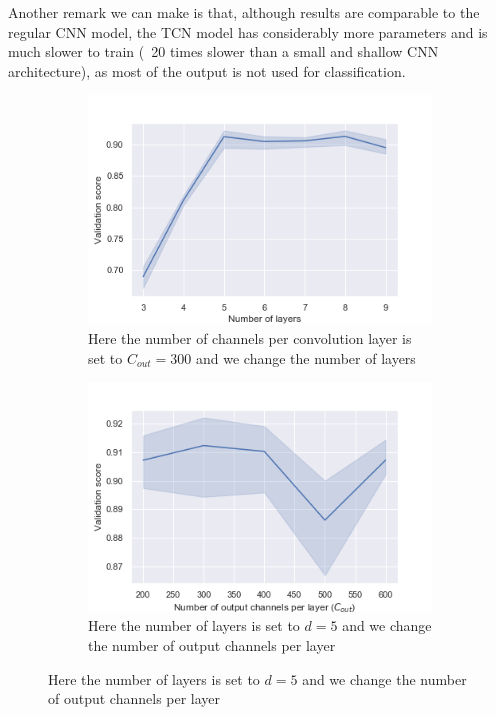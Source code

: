 \documentclass{article}
\begin{document}
Another remark we can make is that, although results are comparable to the regular CNN model, the TCN model has considerably more parameters and is much slower to train (~20 times slower than a small and shallow CNN architecture), as most of the output is not used for classification.
\begin{figure}
    \centering
    \begin{subfigure}{0.45\linewidth}
        \includegraphics[width=\linewidth]{img/tcn_nb_layers.png}
        \caption{Here the number of channels per convolution layer is set to $C_{out}=300$ and we change the number of layers}
        \label{fig:tcn_nb_layers}            
    \end{subfigure}
    \begin{subfigure}{0.45\linewidth}
        \includegraphics[width=\linewidth]{img/tcn_nb_channels.png}
        \caption{Here the number of layers is set to $d=5$ and we change the number of output channels per layer}

\end{subfigure}
\end{figure}
\end{document}
